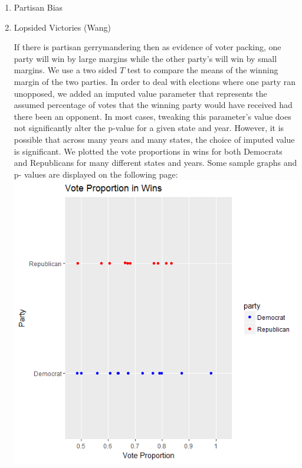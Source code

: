 \documentclass[10pt]{article}
\theoremstyle{definition}
\theoremstyle{remark}
\begin{document}
\begin{enumerate}
\begin{enumerate}
        \item Partisan Bias

        \item Lopsided Victories (Wang)

        If there is partisan gerrymandering then as evidence of voter packing,
        one party will win by large margins while the other party's
        will win by small margins. We use a two sided $T$ test to compare the
        means of the winning margin of the two parties. In order to deal with elections where one 
        party ran unopposed, we added an imputed value parameter that represents the assumed 
        percentage of votes that the winning party would have received had there been an opponent. 
        In most cases, tweaking this parameter's value does not significantly alter the p-value for 
        a given state and year. However, it is possible that across many years and many states, the 
        choice of imputed value is significant. We plotted the vote proportions in wins for both 
        Democrats and Republicans for many different states and years. Some sample graphs and p-
        values are displayed on the following page:  \\
        \includegraphics[scale=0.5]{PA1984}

\end{enumerate}
\end{enumerate}
\end{document}

